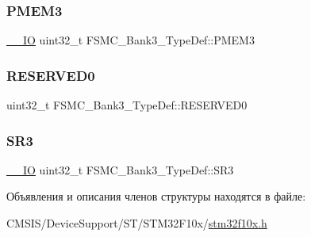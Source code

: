 \subsubsection{\texorpdfstring{PMEM3}{PMEM3}}
{\footnotesize\ttfamily \mbox{\hyperlink{group___c_m_s_i_s___c_m3__core__definitions_gaec43007d9998a0a0e01faede4133d6be}{\+\_\+\+\_\+\+IO}} uint32\+\_\+t F\+S\+M\+C\+\_\+\+Bank3\+\_\+\+Type\+Def\+::\+P\+M\+E\+M3}

\mbox{\label{struct_f_s_m_c___bank3___type_def_a2e9cac528ee7bfce11b0b9a36db3b954}} 
\subsubsection{\texorpdfstring{RESERVED0}{RESERVED0}}
{\footnotesize\ttfamily uint32\+\_\+t F\+S\+M\+C\+\_\+\+Bank3\+\_\+\+Type\+Def\+::\+R\+E\+S\+E\+R\+V\+E\+D0}

\mbox{\label{struct_f_s_m_c___bank3___type_def_ab89f16f64018a1f1e55d36f92b84be94}} 
\subsubsection{\texorpdfstring{SR3}{SR3}}
{\footnotesize\ttfamily \mbox{\hyperlink{group___c_m_s_i_s___c_m3__core__definitions_gaec43007d9998a0a0e01faede4133d6be}{\+\_\+\+\_\+\+IO}} uint32\+\_\+t F\+S\+M\+C\+\_\+\+Bank3\+\_\+\+Type\+Def\+::\+S\+R3}



Объявления и описания членов структуры находятся в файле\+:\begin{DoxyCompactItemize}
\item 
C\+M\+S\+I\+S/\+Device\+Support/\+S\+T/\+S\+T\+M32\+F10x/\mbox{\hyperlink{stm32f10x_8h}{stm32f10x.\+h}}\end{DoxyCompactItemize}
